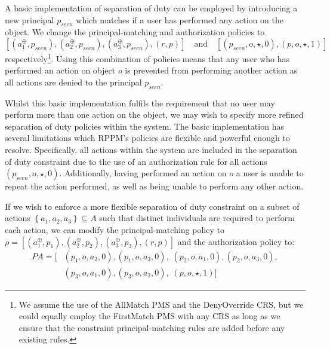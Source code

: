 \documentclass{article}
\newcommand{\set}[1]{\ensuremath{\left\{#1\right\}}} \newcommand{\sett}[1]{\ensuremath{\left\{\textit{#1}\right\}}} \newcommand{\tuple}[1]{\ensuremath{\left(#1\right)}} \newcommand{\tuplet}[1]{\ensuremath{\left(\textit{#1}\right)}}
\newcommand{\audita}[1]{\ensuremath{#1^\oplus}}
\newcommand{\pa}{\mathit{PA}}
\begin{document}
A basic implementation of separation of duty can be employed by introducing a new principal $p_{seen}$ which matches if a user has performed any action on the object.
We change the principal-matching and authorization policies to
\[
  [(\audita{a_1},p_{seen}),(\audita{a_2},p_{seen}),(\audita{a_3},p_{seen}),(r,p)]\quad\text{and}\quad [(p_{seen},o,\star,0),(p,o,\star,1)]
\]
respectively\footnote{We assume the use of the \textsf{AllMatch} PMS and the \textsf{DenyOverride} CRS, but we could equally employ the \textsf{FirstMatch} PMS with any CRS as long as we ensure that the constraint principal-matching rules are added before any existing rules.}.
Using this combination of policies means that any user who has performed an action on object $o$ is prevented from performing another action as all actions are denied to the principal $p_{seen}$.

Whilst this basic implementation fulfils the requirement that no user may perform more than one action on the object, we may wish to specify more refined separation of duty policies within the system.
The basic implementation has several limitations which RPPM's policies are flexible and powerful enough to resolve.
Specifically, all actions within the system are included in the separation of duty constraint due to the use of an authorization rule for all actions $(p_{seen},o,\star,0)$.
Additionally, having performed an action on $o$ a user is unable to repeat the action performed, as well as being unable to perform any other action.

If we wish to enforce a more flexible separation of duty constraint on a subset of actions $\set{a_1, a_2, a_3} \subseteq A$ such that distinct individuals are required to perform each action, we can modify the principal-matching policy to $\rho = [(\audita{a_1},p_1),(\audita{a_2},p_2),(\audita{a_3},p_3),(r,p)]$ and the authorization policy to:
\begin{align*}
    \pa = [&(p_1,o,a_2,0),(p_1,o,a_3,0),
                \;(p_2,o,a_1,0),(p_2,o,a_3,0),\\
                &(p_3,o,a_1,0),(p_3,o,a_2,0),
                \;(p,o,\star,1)]
\end{align*}
\end{document}
